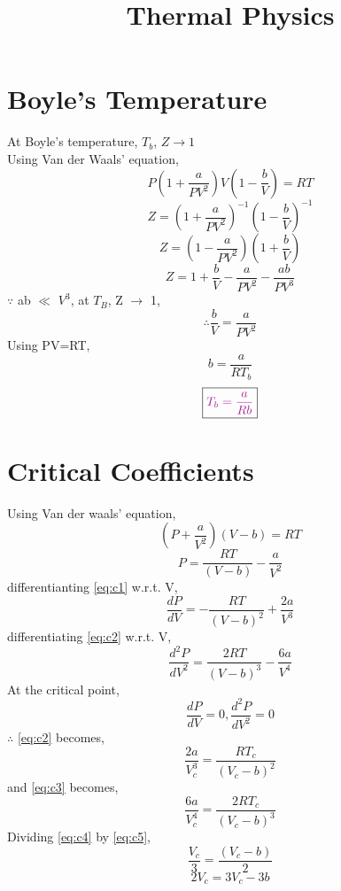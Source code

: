 \documentclass{article}
\title{Thermal Physics}
\numberwithin{equation}{section}
\begin{document}
\maketitle
\tableofcontents
\pagebreak

\section{Boyle's Temperature}
At Boyle's temperature, $T_b$, $Z \to 1$\\
Using Van der Waals' equation,
$$P\left(1+\frac{a}{PV^2}\right) V\left(1-\frac{b}{V}\right) = RT$$
$$Z = \left(1+\frac{a}{PV^2}\right)^{-1} \left(1-\frac{b}{V}\right)^{-1}$$
$$Z = \left(1 - \frac{a}{PV^2}\right) \left(1+\frac{b}{V}\right)$$
$$Z = 1 + \frac{b}{V} - \frac{a}{PV^2} - \frac{ab}{PV^3}$$
$\because$ ab $\ll$ $V^3$,
at $T_B$, Z $\to$ 1,
$$\therefore \frac{b}{V} = \frac{a}{PV^2}$$
Using PV=RT,
$$b = \frac{a}{RT_b}$$
\begin{equation}
  \boxed{\textcolor{Mulberry}{T_b = \frac{a}{Rb}}} \label{eq:b1}
\end{equation}

\section{Critical Coefficients}
Using Van der waals' equation,
$$\left(P+\frac{a}{V^2}\right) \left(V-b\right) = RT$$
\begin{equation}
  P = \frac{RT}{\left(V-b\right)} - \frac{a}{V^2} \label{eq:c1}
\end{equation}
differentianting \eqref{eq:c1} w.r.t. V,
\begin{equation}
  \frac{dP}{dV} = - \frac{RT}{\left(V-b\right)^2} + \frac{2a}{V^3} \label{eq:c2}
\end{equation}
differentiating \eqref{eq:c2} w.r.t. V,
\begin{equation}
  \frac{d^2P}{dV^2} = \frac{2RT}{\left(V-b\right)^3} - \frac{6a}{V^4} \label{eq:c3}
\end{equation}
At the critical point,
$$\frac{dP}{dV} = 0  ,  \frac{d^2P}{dV^2} = 0$$
$\therefore$ \eqref{eq:c2} becomes,
\begin{equation}
  \frac{2a}{V_c^3} = \frac{RT_c}{\left(V_c-b\right)^2} \label{eq:c4}
\end{equation}
and \eqref{eq:c3} becomes,
\begin{equation}
  \frac{6a}{V_c^4} = \frac{2RT_c}{\left(V_c-b\right)^3} \label{eq:c5}
\end{equation}
Dividing \eqref{eq:c4} by \eqref{eq:c5},
$$\frac{V_c}{3} = \frac{\left(V_c-b\right)}{2}$$
$$2V_c = 3V_c - 3b$$
\end{document}
